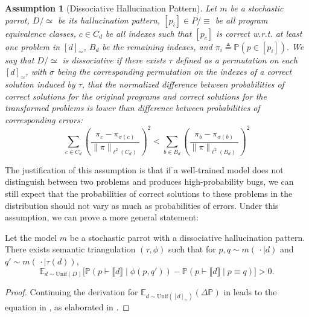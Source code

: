\documentclass[acmsmall,screen,nonacm]{acmart}
\newtheorem{assumption}{Assumption}
\begin{document}
\begin{assumption}[Dissociative Hallucination Pattern]\label{assume:easy_pattern}
  Let $m$ be a stochastic parrot, $D/\simeq$ be its hallucination pattern, $[p_i] \in P/\equiv$ be all program equivalence classes, $c\in C_d$ be all indexes such that $[p_c]$ is correct w.r.t. at least one problem in $[d]_\simeq$, $B_d$ be the remaining indexes, and $\pi_i \triangleq \mathds{P}(p \in [p_i]).$ We say that $D/\simeq$ is dissociative if there exists $\tau$ defined as a permutation on each $[d]_\simeq$, with $\sigma$ being the corresponding permutation on the indexes of a correct solution induced by $\tau$, that the normalized difference between probabilities of correct solutions for the original programs and correct solutions for the transformed problems is lower than difference between probabilities of corresponding errors:
\begin{equation}
 \sum_{c\in C_d}\left(\frac{\pi_c-\pi_{\sigma(c)}}{\|\pi\|_{\ell^2(C_d)}}\right)^2
<\sum_{b\in B_d}\left(\frac{\pi_b-\pi_{\sigma(b)}}{\|\pi\|_{\ell^2(B_d)}}\right)^2
\end{equation}
\end{assumption}

\noindent The justification of this assumption is that if a well-trained model does not distinguish between two problems and produces high-probability bugs, we can still expect that the probabilities of correct solutions to these problems in the distribution should not vary as much as probabilities of errors. Under this assumption, we can prove a more general statement:

\begin{proposition}\label{prop:triangulation_vs_plurality_easy}
Let the model $m$ be a stochastic parrot with a dissociative hallucination pattern. There exists semantic triangulation $(\tau, \phi)$ such that for $p, q\sim m(\,\cdot\mid d)$ and $q'\sim m(\,\cdot\mid \tau(d)),$
  \begin{equation*}
    \mathds{E}_{d\sim\mathrm{Unif}(D)} \bigl[ \mathds{P}(p \vdash \llbracket d \rrbracket \mid \phi(p, q')) - \mathds{P}(p \vdash \llbracket d \rrbracket \mid p \equiv q) \bigr] > 0.
\end{equation*}
\end{proposition}

\begin{proof}
Continuing the derivation for $\mathds{E}_{d\sim\mathrm{Unif}([d]_\simeq)}(\Delta \mathds{P})$ in  leads to the equation in , as elaborated in .
\end{proof}
\end{document}
